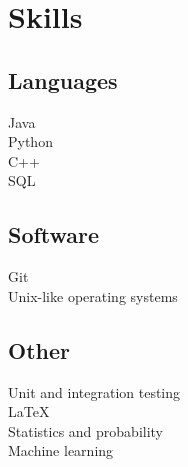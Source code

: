 \documentclass[]{deedy-resume-openfont}
\begin{document}
\begin{minipage}[t]{0.33\textwidth}

\section{Skills}

\subsection{Languages}
\textbullet{} Java \\
\textbullet{} Python \\
\textbullet{} C++ \\
\textbullet{} SQL

\subsection{Software}
\textbullet{} Git \\
\textbullet{} Unix-like operating systems

\subsection{Other}
\textbullet{} Unit and integration testing \\
\textbullet{} \LaTeX\ \\ 
\textbullet{} Statistics and probability \\
\textbullet{} Machine learning

%
%

\end{minipage} 
\hfill
\end{document}
